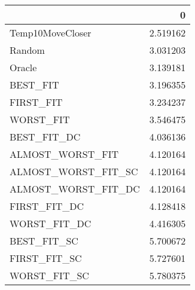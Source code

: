 \begin{tabular}{lr}
\toprule
{} &         0 \\
\midrule
Temp10MoveCloser     &  2.519162 \\
Random               &  3.031203 \\
Oracle               &  3.139181 \\
 BEST\_FIT            &  3.196355 \\
 FIRST\_FIT           &  3.234237 \\
 WORST\_FIT           &  3.546475 \\
 BEST\_FIT\_DC         &  4.036136 \\
 ALMOST\_WORST\_FIT    &  4.120164 \\
 ALMOST\_WORST\_FIT\_SC &  4.120164 \\
 ALMOST\_WORST\_FIT\_DC &  4.120164 \\
 FIRST\_FIT\_DC        &  4.128418 \\
 WORST\_FIT\_DC        &  4.416305 \\
 BEST\_FIT\_SC         &  5.700672 \\
 FIRST\_FIT\_SC        &  5.727601 \\
 WORST\_FIT\_SC        &  5.780375 \\
\bottomrule
\end{tabular}

